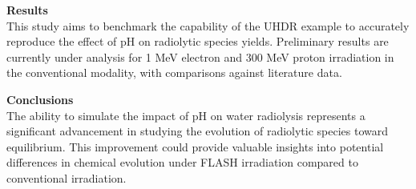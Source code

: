 \begin{talk}
\textbf{Results}\\
This study aims to benchmark the capability of the UHDR example to accurately reproduce the effect of pH on radiolytic species yields. Preliminary results are currently under analysis for 1 MeV electron and 300 MeV proton irradiation in the conventional modality, with comparisons against literature data.

\textbf{Conclusions}\\
The ability to simulate the impact of pH on water radiolysis represents a significant advancement in studying the evolution of radiolytic species toward equilibrium. This improvement could provide valuable insights into potential differences in chemical evolution under FLASH irradiation compared to conventional irradiation.


\medskip



\end{talk}

